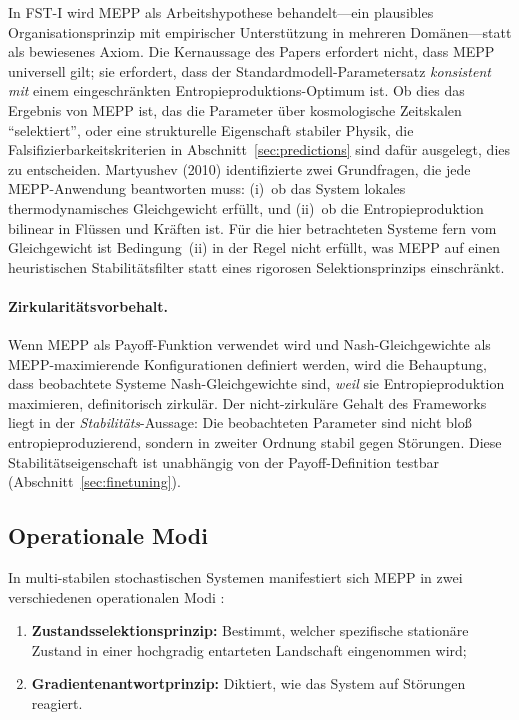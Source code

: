 \documentclass[12pt,a4paper]{article}
\theoremstyle{remark}
\begin{document}
In FST-I wird MEPP als Arbeitshypothese behandelt---ein plausibles Organisationsprinzip mit empirischer Unterst\"utzung in mehreren Dom\"anen---statt als bewiesenes Axiom. Die Kernaussage des Papers erfordert nicht, dass MEPP universell gilt; sie erfordert, dass der Standardmodell-Parametersatz \emph{konsistent mit} einem eingeschr\"ankten Entropieproduktions-Optimum ist. Ob dies das Ergebnis von MEPP ist, das die Parameter \"uber kosmologische Zeitskalen ``selektiert'', oder eine strukturelle Eigenschaft stabiler Physik, die Falsifizierbarkeitskriterien in Abschnitt~\ref{sec:predictions} sind daf\"ur ausgelegt, dies zu entscheiden. Martyushev (2010) \citep{Martyushev2010} identifizierte zwei Grundfragen, die jede MEPP-Anwendung beantworten muss: (i)~ob das System lokales thermodynamisches Gleichgewicht erf\"ullt, und (ii)~ob die Entropieproduktion bilinear in Fl\"ussen und Kr\"aften ist. F\"ur die hier betrachteten Systeme fern vom Gleichgewicht ist Bedingung~(ii) in der Regel nicht erf\"ullt, was MEPP auf einen heuristischen Stabilit\"atsfilter statt eines rigorosen Selektionsprinzips einschr\"ankt.

\paragraph{Zirkularit\"atsvorbehalt.} Wenn MEPP als Payoff-Funktion verwendet wird und Nash-Gleichgewichte als MEPP-maximierende Konfigurationen definiert werden, wird die Behauptung, dass beobachtete Systeme Nash-Gleichgewichte sind, \emph{weil} sie Entropieproduktion maximieren, definitorisch zirkul\"ar. Der nicht-zirkul\"are Gehalt des Frameworks liegt in der \emph{Stabilit\"ats}-Aussage: Die beobachteten Parameter sind nicht blo\ss{} entropieproduzierend, sondern in zweiter Ordnung stabil gegen St\"orungen. Diese Stabilit\"atseigenschaft ist unabh\"angig von der Payoff-Definition testbar (Abschnitt~\ref{sec:finetuning}).

\subsection{Operationale Modi}

In multi-stabilen stochastischen Systemen manifestiert sich MEPP in zwei verschiedenen operationalen Modi \citep{MEPP2023}:
\begin{enumerate}
    \item \textbf{Zustandsselektionsprinzip:} Bestimmt, welcher spezifische station\"are Zustand in einer hochgradig entarteten Landschaft eingenommen wird;
    \item \textbf{Gradientenantwortprinzip:} Diktiert, wie das System auf St\"orungen reagiert.
\end{enumerate}
\end{document}
